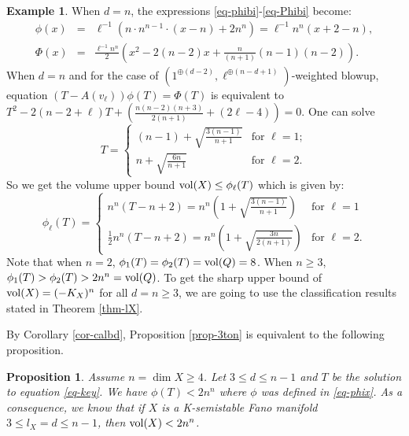 \documentclass[12pt]{amsart}
\newtheorem{prop}[thm]{Proposition}
\theoremstyle{definition}
\newtheorem{ex}[thm]{Example}
\def\vol{{\rm vol}}
\begin{document}
\begin{ex}\label{ex-d=n}
When $d=n$, the expressions \eqref{eq-phibi}-\eqref{eq-Phibi} become: 
\begin{eqnarray}
    \phi(x)&=&\ell^{-1}\left(n \cdot n^{n-1}\cdot (x-n)+2 n^n\right)
    =\ell^{-1}n^n(x+2-n),\label{eq-phidn} \\
    \Phi(x)%
    &=&\frac{\ell^{-1}n^n}{2}\left(x^2-2(n-2)x+\frac{n}{(n+1)}(n-1)(n-2)\right).\nonumber 
\end{eqnarray}
 When $d=n$ and for the case of $(1^{\oplus(d-2)},\ell^{\oplus(n-d+1)})$-weighted blowup, equation $(T-A(v_\ell))\phi(T)=\Phi(T)$ is equivalent to $T^2-2(n-2+\ell) T+\left(\frac{n(n-2)(n+3)}{2(n+1)}+(2\ell-4)\right)=0$. One can solve \begin{equation*}
     T=\left\{
     \begin{array}{ll}
     (n-1)+\sqrt{\frac{3(n-1)}{n+1}} & \text{for } \ell=1; \\
     n+ \sqrt{\frac{6n}{n+1}}& \text{for } \ell=2.
     \end{array}
     \right.
 \end{equation*}
 So we get the volume upper bound $\vol(X)\le \phi_\ell(T)$ which is given by:
 \begin{equation*}
 \phi_\ell(T)=
 \left\{
     \begin{array}{ll}
     n^n (T-n+2)=n^n (1+\sqrt{\frac{3(n-1)}{n+1}}) & \text{for } \ell=1\\
     \frac{1}{2}n^n(T-n+2)=n^n\left(1+\sqrt{\frac{3n}{2(n+1)}}\right) & \text{for } \ell=2.
     \end{array}
     \right.
 \end{equation*}
 Note that when $n=2$, $\phi_1(T)=\phi_2(T)=\vol(Q)=8$. When $n\ge 3$, $\phi_1(T)>\phi_2(T)>2n^n=\vol(Q)$. To get the sharp upper bound of $\vol(X)=(-K_X)^n$ for all $d=n\ge 3$, we are going to use the classification results stated in Theorem \ref{thm-lX}. 

\end{ex}


By Corollary \ref{cor-calbd},  Proposition \ref{prop-3ton} is equivalent to the following proposition. 
\begin{prop}\label{prop-3&n-1}
    Assume $n=\dim X\ge 4$. 
    Let $3\le d\le n-1$ and $T$ be the solution to equation \eqref{eq-key}. We have $\phi(T)<2n^n$ where $\phi$ was defined in \eqref{eq-phix}. As a consequence, we know that if $X$ is a K-semistable Fano manifold $3\le l_X=d\le n-1$, then $\vol(X)<2n^n$. 
\end{prop}
\end{document}
